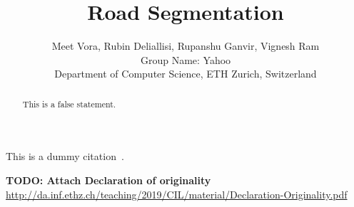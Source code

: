 \documentclass[10pt,conference,compsocconf]{IEEEtran}
\begin{document}
\title{Road Segmentation}

\author{
  Meet Vora, Rubin Deliallisi, Rupanshu Ganvir, Vignesh Ram \\
  Group Name: Yahoo \\
  Department of Computer Science, ETH Zurich, Switzerland
}

\maketitle

\begin{abstract}
  This is a false statement.
\end{abstract}

This is a dummy citation~\cite{jones08}.








\textbf{TODO: Attach Declaration of originality}
\url{http://da.inf.ethz.ch/teaching/2019/CIL/material/Declaration-Originality.pdf}




\end{document}
